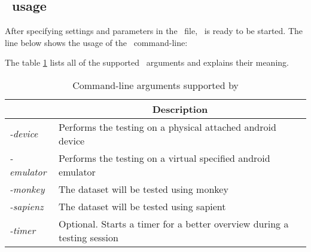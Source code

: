 \subsection{\toolname\ usage}
After specifying settings and parameters in the \Config\ file, \toolname\ is ready to be started. 
The line below shows the usage of the \toolname\ command-line: 
\begin{center}
\end{center}
The table \ref{tbl: toolarguments} lists all of the supported \toolname\ arguments and explains their meaning. 
\begin{table}[tb]
\centering
\caption{Command-line arguments supported by \toolname}
\label{tbl: toolarguments}
\begin{tabular}{|l|l|}
\hline
\rowcolor[HTML]{EFEFEF} 
\multicolumn{1}{|c|}{\cellcolor[HTML]{EFEFEF}\textbf{Supported arguments}} & \multicolumn{1}{c|}{\cellcolor[HTML]{EFEFEF}\textbf{Description}}        \\ \hline
\textit{-device}                                                           & Performs the testing on a physical attached android device               \\ \hline
\textit{-emulator}                                                         & Performs the testing on a virtual specified android emulator             \\ \hline
\textit{-monkey}                                                           & The dataset will be tested using monkey                                  \\ \hline
\textit{-sapienz}                                                          & The dataset will be tested using sapient                                 \\ \hline
\textit{-timer}                                                            & Optional.  Starts a timer for a better overview during a testing session \\ \hline
\end{tabular}
\end{table}
  


































